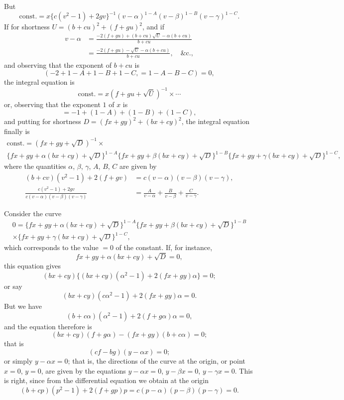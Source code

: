 \documentclass[11pt,a4paper]{article}
\begin{document}
But
\[
\text{const.} = x\{c(v^2-1) + 2gv\}^{-1}(v-\alpha)^{1-A}(v-\beta)^{1-B}(v-\gamma)^{1-C}.
\]
If for shortness $U = (b+cu)^2 + (f+gu)^2$, and if
\begin{align*}
v - \alpha &= \frac{-2(f+gu) + (b+cu)\sqrt{U} - \alpha(b+cu)}{b+cu} \\
&= \frac{-2(f+gu) - \sqrt{U} - \alpha(b+cu)}{b+cu}, \quad \&\text{c.},
\end{align*}
and observing that the exponent of $b+cu$ is
\[
(-2+1-A+1-B+1-C, = 1-A-B-C) = 0,
\]
the integral equation is
\[
\text{const.} = x(f+gu + \sqrt{U})^{-1} \times \cdots
\]
or, observing that the exponent $1$ of $x$ is
\[
= -1 + (1-A) + (1-B) + (1-C),
\]
and putting for shortness $D = (fx+gy)^2 + (bx+cy)^2$, the integral equation finally is
\begin{multline*}
\text{const.} = (fx+gy + \sqrt{D})^{-1} \times \\
\{fx+gy + \alpha(bx+cy) + \sqrt{D}\}^{1-A}
\{fx+gy + \beta(bx+cy) + \sqrt{D}\}^{1-B}
\{fx+gy + \gamma(bx+cy) + \sqrt{D}\}^{1-C},
\end{multline*}
where the quantities $\alpha$, $\beta$, $\gamma$, $A$, $B$, $C$ are given by
\begin{align*}
(b+cv)(v^2-1) + 2(f+gv) &= c(v-\alpha)(v-\beta)(v-\gamma), \\
\frac{c(v^2-1) + 2gv}{c(v-\alpha)(v-\beta)(v-\gamma)} &= \frac{A}{v-\alpha} + \frac{B}{v-\beta} + \frac{C}{v-\gamma}.
\end{align*}

Consider the curve
\begin{multline*}
0 = \{fx+gy + \alpha(bx+cy) + \sqrt{D}\}^{1-A}
\{fx+gy + \beta(bx+cy) + \sqrt{D}\}^{1-B} \\
\times \{fx+gy + \gamma(bx+cy) + \sqrt{D}\}^{1-C},
\end{multline*}
which corresponds to the value $=0$ of the constant. If, for instance,
\[
fx+gy + \alpha(bx+cy) + \sqrt{D} = 0,
\]
this equation gives
\[
(bx+cy)\{(bx+cy)(\alpha^2-1) + 2(fx+gy)\alpha\} = 0;
\]
or say
\[
(bx+cy)(c\alpha^2-1) + 2(fx+gy)\alpha = 0.
\]
But we have
\[
(b+c\alpha)(\alpha^2-1) + 2(f+g\alpha)\alpha = 0,
\]
and the equation therefore is
\[
(bx+cy)(f+g\alpha) - (fx+gy)(b+c\alpha) = 0;
\]
that is
\[
(cf-bg)(y-\alpha x) = 0;
\]
or simply $y - \alpha x = 0$; that is, the directions of the curve at the origin, or point $x=0$, $y=0$, are given by the equations $y - \alpha x = 0$, $y - \beta x = 0$, $y - \gamma x = 0$. This is right, since from the differential equation we obtain at the origin
\[
(b+cp)(p^2-1) + 2(f+gp)p = c(p-\alpha)(p-\beta)(p-\gamma) = 0.
\]
\end{document}
